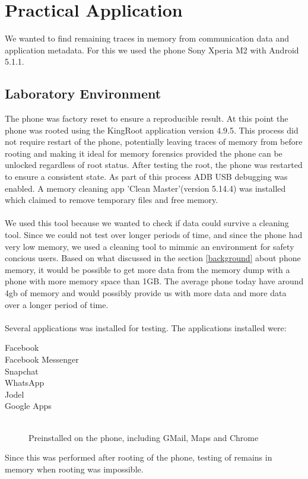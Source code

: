 \section{Practical Application}
We wanted to find remaining traces in memory from communication data and application metadata. For this we used the phone Sony Xperia M2 with Android 5.1.1.

\subsection{Laboratory Environment}
The phone was factory reset to ensure a reproducible result. At this point the phone was rooted %
using the KingRoot application version 4.9.5. This process did not require restart of the phone, potentially leaving traces of memory from before rooting and making it ideal for memory forensics provided the phone can be unlocked regardless of root status. After testing the root, the phone was restarted to ensure a consistent state. As part of this process ADB USB debugging was enabled. A memory cleaning app 'Clean Master'(version 5.14.4) was installed which claimed to remove temporary files and free memory.\\\\ %

We used this tool because we wanted to check if data could survive a cleaning tool. Since we could not test over longer periods of time, and since the phone had very low memory, we used a cleaning tool to mimmic an environment for safety concious users. Based on what discussed in the section \ref{background} about phone memory, it would be possible to get more data from the memory dump with a phone with more memory space than 1GB. The average phone today have around 4gb of memory and would possibly provide us with more data and more data over a longer period of time.\\\\

Several applications was installed for testing. The applications installed were:
\begin{description}
\item[Facebook]
\item[Facebook Messenger]
\item[Snapchat]
\item[WhatsApp]
\item[Jodel]
\item[Google Apps] \hfill\\Preinstalled on the phone, including GMail, Maps and Chrome
\end{description}
Since this was performed after rooting of the phone, testing of remains in memory when rooting was impossible.

